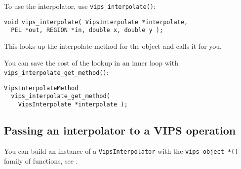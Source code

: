 To use the interpolator, use \verb+vips_interpolate()+:

\begin{verbatim}
void vips_interpolate( VipsInterpolate *interpolate,
  PEL *out, REGION *in, double x, double y );
\end{verbatim}

\noindent
This looks up the interpolate method for the object and calls it for you.

You can save the cost of the lookup in an inner loop with
\verb+vips_interpolate_get_method()+:

\begin{verbatim}
VipsInterpolateMethod 
  vips_interpolate_get_method( 
    VipsInterpolate *interpolate );
\end{verbatim}

\subsection{Passing an interpolator to a VIPS operation}

You can build an instance of a \verb+VipsInterpolator+ with
the \verb+vips_object_*()+ family of functions, see .
